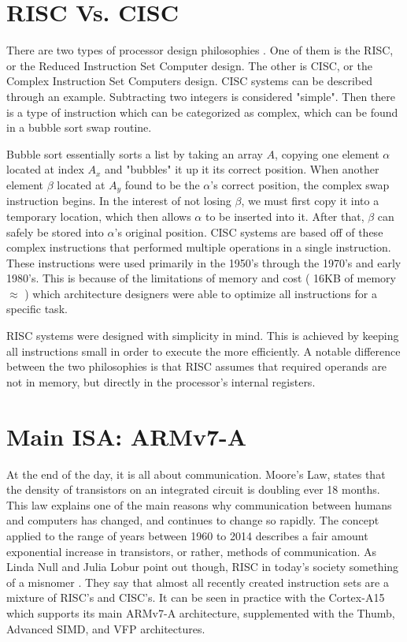 \documentclass[12pt]{scrreprt}
\begin{document}
	\section{RISC Vs. CISC}

	There are two types of processor design philosophies \autocite[5]{riscGuide}.
	One of them is the RISC, or the Reduced Instruction Set Computer design.
	The other is CISC, or the Complex Instruction Set Computers design.
	CISC systems can be described through an example.
	Subtracting two integers is considered "simple".
	Then there is a type of instruction which can be categorized as complex, which can be found in a bubble sort swap routine.

	
	Bubble sort essentially sorts a list by taking an array $ A $, copying one element $ \alpha $ located at index $ A_{x} $ and "bubbles" it up it its correct position.
	When another element $\beta$ located at $ A_{y} $ found to be the $ \alpha $'s correct position, the complex swap instruction begins.
	In the interest of not losing $\beta$, we must first copy it into a temporary location, which then allows $\alpha$ to be inserted into it.
	After that, $\beta$ can safely be stored into $\alpha$'s original position.
	CISC systems are based off of these complex instructions that performed multiple operations in a single instruction.
	These instructions were used primarily in the 1950's through the 1970's and early 1980's.
	This is because of the limitations of memory and cost ( 16KB of memory $\approx$  ) which architecture designers were able to optimize all instructions for a specific task.

	RISC systems were designed with simplicity in mind.
	This is achieved by keeping all instructions small in order to execute the more efficiently.
	A notable difference between the two philosophies is that RISC assumes that required operands are not in memory, but directly in the processor's internal registers.

	\section{Main ISA: ARMv7-A}

	At the end of the day, it is all about communication.
	Moore's Law, states that the density of transistors on an integrated circuit is doubling ever 18 months.
	This law explains one of the main reasons why communication between humans and computers has changed, and continues to change so rapidly.
	The concept applied to the range of years between 1960 to 2014 describes a fair amount exponential increase in transistors, or rather, methods of communication.
	As Linda Null and Julia Lobur point out though, RISC in today's society something of a misnomer \autocite[327]{classtext}.
	They say that almost all recently created instruction sets are a mixture of RISC's and CISC's.
	It can be seen in practice with the Cortex-A15 which supports its main ARMv7-A architecture, supplemented with the Thumb, Advanced SIMD, and VFP architectures.
\end{document}
